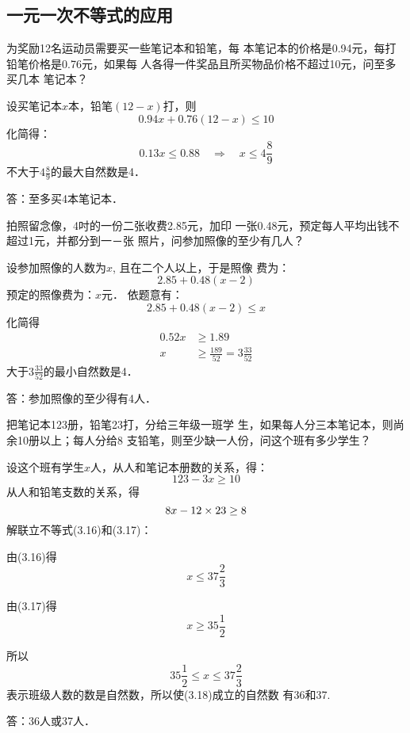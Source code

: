 \subsection{一元一次不等式的应用}

\begin{example}
    为奖励12名运动员需要买一些笔记本和铅笔，每
本笔记本的价格是0.94元，每打铅笔价格是0.76元，如果每
人各得一件奖品且所买物品价格不超过10元，问至多买几本
笔记本？
\end{example}


\begin{solution}
    设买笔记本$x$本，铅笔$(12-x)$打，则
\[0.94x+0.76(12-x)\le 10\]
化简得：
\[0.13x\le 0.88\quad \Rightarrow\quad x\le 4\frac{8}{9}\]
不大于$4\frac{8}{9}$的最大自然数是4．

答：至多买4本笔记本．
\end{solution}
    

    
\begin{example}
    拍照留念像，4吋的一份二张收费2.85元，加印
一张0.48元，预定每人平均出钱不超过1元，并都分到一－张
照片，问参加照像的至少有几人？
\end{example}

\begin{solution}
设参加照像的人数为$x$, 且在二个人以上，于是照像
费为：
\[2.85+0.48(x-2)\]
预定的照像费为：$x$元．
依题意有：
\[2.85+0.48(x-2)\le x\]
化简得
\[\begin{split}
    0.52x&\ge 1.89\\
x&\ge \frac{189}{52}=3\frac{33}{52}
\end{split}\]
大于$3\frac{33}{52}$的最小自然数是4．

答：参加照像的至少得有4人．
\end{solution}
    

\begin{example}
把笔记本123册，铅笔23打，分给三年级一班学
生，如果每人分三本笔记本，则尚余10册以上；每人分给8
支铅笔，则至少缺一人份，问这个班有多少学生？
\end{example}

\begin{solution}
 设这个班有学生$x$人，从人和笔记本册数的关系，得：
 \begin{equation}
     123-3x\ge 10
 \end{equation}
从人和铅笔支数的关系，得
\begin{equation}
    8x-12\times 23\ge 8
\end{equation}
解联立不等式(3.16)和(3.17)：

由(3.16)得
\[x\le 37\frac{2}{3}\]

由(3.17)得
\[x\ge 35\frac{1}{2}\]

所以
\begin{equation}
    35\frac{1}{2}\le x\le 37\frac{2}{3}
\end{equation}
表示班级人数的数是自然数，所以使(3.18)成立的自然数
有36和37.

答：36人或37人．
\end{solution}

